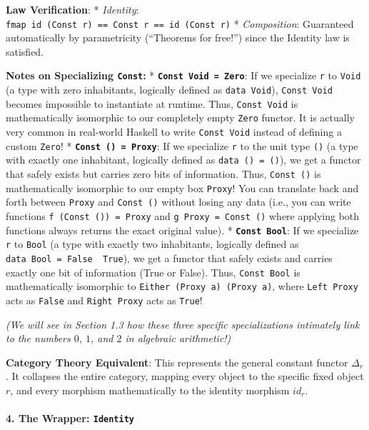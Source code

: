 \documentclass[
]{article}
\begin{document}
\textbf{Law Verification}: * \emph{Identity}:
\texttt{fmap\ id\ (Const\ r)\ ==\ Const\ r\ ==\ id\ (Const\ r)} *
\emph{Composition}: Guaranteed automatically by parametricity
(``Theorems for free!'') since the Identity law is satisfied.

\textbf{Notes on Specializing \texttt{Const}:} *
\textbf{\texttt{Const\ Void\ =\ Zero}}: If we specialize \texttt{r} to
\texttt{Void} (a type with zero inhabitants, logically defined as
\texttt{data\ Void}), \texttt{Const\ Void} becomes impossible to
instantiate at runtime. Thus, \texttt{Const\ Void} is mathematically
isomorphic to our completely empty \texttt{Zero} functor. It is actually
very common in real-world Haskell to write \texttt{Const\ Void} instead
of defining a custom \texttt{Zero}! *
\textbf{\texttt{Const\ ()\ =\ Proxy}}: If we specialize \texttt{r} to
the unit type \texttt{()} (a type with exactly one inhabitant, logically
defined as \texttt{data\ ()\ =\ ()}), we get a functor that safely
exists but carries zero bits of information. Thus, \texttt{Const\ ()} is
mathematically isomorphic to our empty box \texttt{Proxy}! You can
translate back and forth between \texttt{Proxy} and \texttt{Const\ ()}
without losing any data (i.e., you can write functions
\texttt{f\ (Const\ ())\ =\ Proxy} and \texttt{g\ Proxy\ =\ Const\ ()}
where applying both functions always returns the exact original value).
* \textbf{\texttt{Const\ Bool}}: If we specialize \texttt{r} to
\texttt{Bool} (a type with exactly two inhabitants, logically defined as
\texttt{data\ Bool\ =\ False\ \textbar{}\ True}), we get a functor that
safely exists and carries exactly one bit of information (True or
False). Thus, \texttt{Const\ Bool} is mathematically isomorphic to
\texttt{Either\ (Proxy\ a)\ (Proxy\ a)}, where \texttt{Left\ Proxy} acts
as \texttt{False} and \texttt{Right\ Proxy} acts as \texttt{True}!

\emph{(We will see in Section 1.3 how these three specific
specializations intimately link to the numbers \(0\), \(1\), and \(2\)
in algebraic arithmetic!)}

\textbf{Category Theory Equivalent}: This represents the general
constant functor \(\Delta_r\). It collapses the entire category, mapping
every object to the specific fixed object \(r\), and every morphism
mathematically to the identity morphism \(id_r\).

\paragraph{\texorpdfstring{4. The Wrapper:
\texttt{Identity}}{4. The Wrapper: Identity}}\label{the-wrapper-identity}
\end{document}
